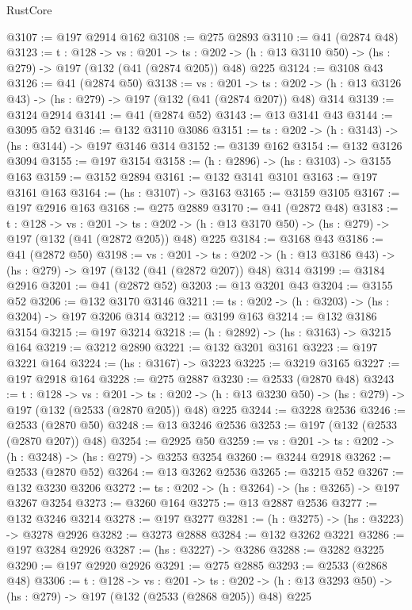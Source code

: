 \begin{lexlean}{RustCore}
\begin{coremodule}
@3107 := @197 @2914 @162
@3108 := @275 @2893
@3110 := @41 (@2874 @48)
@3123 := {t : @128} ->
  {vs : @201} ->
  {ts : @202} -> (h : @13 @3110 @50) -> (hs : @279) -> @197 (@132 (@41 (@2874 @205)) @48) @225
@3124 := @3108 @43
@3126 := @41 (@2874 @50)
@3138 := {vs : @201} ->
  {ts : @202} -> (h : @13 @3126 @43) -> (hs : @279) -> @197 (@132 (@41 (@2874 @207)) @48) @314
@3139 := @3124 @2914
@3141 := @41 (@2874 @52)
@3143 := @13 @3141 @43
@3144 := @3095 @52
@3146 := @132 @3110 @3086
@3151 := {ts : @202} -> (h : @3143) -> (hs : @3144) -> @197 @3146 @314
@3152 := @3139 @162
@3154 := @132 @3126 @3094
@3155 := @197 @3154
@3158 := (h : @2896) -> (hs : @3103) -> @3155 @163
@3159 := @3152 @2894
@3161 := @132 @3141 @3101
@3163 := @197 @3161 @163
@3164 := (hs : @3107) -> @3163
@3165 := @3159 @3105
@3167 := @197 @2916 @163
@3168 := @275 @2889
@3170 := @41 (@2872 @48)
@3183 := {t : @128} ->
  {vs : @201} ->
  {ts : @202} -> (h : @13 @3170 @50) -> (hs : @279) -> @197 (@132 (@41 (@2872 @205)) @48) @225
@3184 := @3168 @43
@3186 := @41 (@2872 @50)
@3198 := {vs : @201} ->
  {ts : @202} -> (h : @13 @3186 @43) -> (hs : @279) -> @197 (@132 (@41 (@2872 @207)) @48) @314
@3199 := @3184 @2916
@3201 := @41 (@2872 @52)
@3203 := @13 @3201 @43
@3204 := @3155 @52
@3206 := @132 @3170 @3146
@3211 := {ts : @202} -> (h : @3203) -> (hs : @3204) -> @197 @3206 @314
@3212 := @3199 @163
@3214 := @132 @3186 @3154
@3215 := @197 @3214
@3218 := (h : @2892) -> (hs : @3163) -> @3215 @164
@3219 := @3212 @2890
@3221 := @132 @3201 @3161
@3223 := @197 @3221 @164
@3224 := (hs : @3167) -> @3223
@3225 := @3219 @3165
@3227 := @197 @2918 @164
@3228 := @275 @2887
@3230 := @2533 (@2870 @48)
@3243 := {t : @128} ->
  {vs : @201} ->
  {ts : @202} -> (h : @13 @3230 @50) -> (hs : @279) -> @197 (@132 (@2533 (@2870 @205)) @48) @225
@3244 := @3228 @2536
@3246 := @2533 (@2870 @50)
@3248 := @13 @3246 @2536
@3253 := @197 (@132 (@2533 (@2870 @207)) @48)
@3254 := @2925 @50
@3259 := {vs : @201} -> {ts : @202} -> (h : @3248) -> (hs : @279) -> @3253 @3254
@3260 := @3244 @2918
@3262 := @2533 (@2870 @52)
@3264 := @13 @3262 @2536
@3265 := @3215 @52
@3267 := @132 @3230 @3206
@3272 := {ts : @202} -> (h : @3264) -> (hs : @3265) -> @197 @3267 @3254
@3273 := @3260 @164
@3275 := @13 @2887 @2536
@3277 := @132 @3246 @3214
@3278 := @197 @3277
@3281 := (h : @3275) -> (hs : @3223) -> @3278 @2926
@3282 := @3273 @2888
@3284 := @132 @3262 @3221
@3286 := @197 @3284 @2926
@3287 := (hs : @3227) -> @3286
@3288 := @3282 @3225
@3290 := @197 @2920 @2926
@3291 := @275 @2885
@3293 := @2533 (@2868 @48)
@3306 := {t : @128} ->
  {vs : @201} ->
  {ts : @202} -> (h : @13 @3293 @50) -> (hs : @279) -> @197 (@132 (@2533 (@2868 @205)) @48) @225

\end{coremodule}
\end{lexlean}
